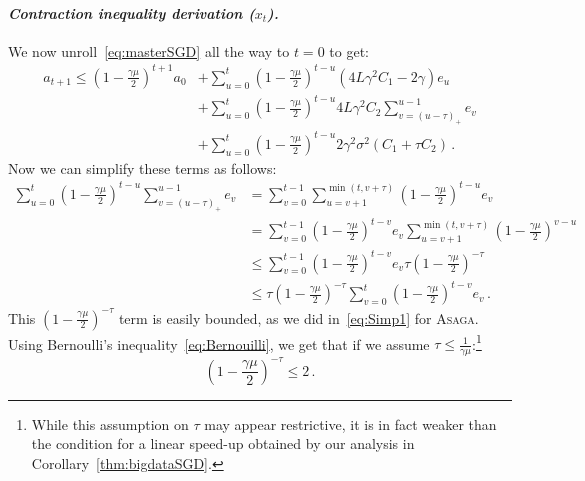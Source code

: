 \documentclass[twoside, 11pt]{article}
\newcommand{\stepsize}{\gamma}
\newcommand{\strongconvex}{\mu}
\newcommand{\overlap}{\tau}
\newcommand{\lipschitz}{L}
\newcommand{\ASAGA}{\textsc{Asaga}}
\begin{document}
\paragraph{\textit{Contraction inequality derivation ($x_t$).}}
We now unroll~\eqref{eq:masterSGD} all the way to $t=0$ to get:
\begin{equation}\label{eq:sgdcontr}
\begin{aligned}
a_{t+1}
\leq (1 - \frac{\stepsize\strongconvex}{2})^{t+1} a_0
&+ \sum_{u = 0}^{t} (1 - \frac{\stepsize\strongconvex}{2})^{t-u} (4\lipschitz \stepsize^2 C_1 - 2 \stepsize) e_u
\\
&+ \sum_{u = 0}^{t} (1 - \frac{\stepsize\strongconvex}{2})^{t-u} 4\lipschitz \stepsize^2 C_2 \sum_{v = (u - \overlap)_+}^{u-1} e_v
\\
&+ \sum_{u = 0}^{t} (1 - \frac{\stepsize\strongconvex}{2})^{t-u} 2 \stepsize^2 \sigma^2 (C_1 +  \overlap C_2) \,.
\end{aligned}
\end{equation}
Now we can simplify these terms as follows:
\begin{align}
\sum_{u = 0}^{t} (1 - \frac{\stepsize\strongconvex}{2})^{t-u}  \sum_{v = (u - \overlap)_+}^{u-1} e_v
&=
\sum_{v = 0}^{t-1} \sum_{u = v +1}^{\min(t, v + \overlap)} (1 - \frac{\stepsize\strongconvex}{2})^{t-u} e_v
\nonumber \\
&=
\sum_{v = 0}^{t-1} (1 - \frac{\stepsize\strongconvex}{2})^{t-v} e_v \sum_{u = v +1}^{\min(t, v + \overlap)} (1 - \frac{\stepsize\strongconvex}{2})^{v-u}
\nonumber \\
&\leq \sum_{v = 0}^{t-1} (1 - \frac{\stepsize\strongconvex}{2})^{t-v} e_v \overlap (1 - \frac{\stepsize\strongconvex}{2})^{-\overlap}
\nonumber \\
&\leq \overlap (1 - \frac{\stepsize\strongconvex}{2})^{-\overlap} \sum_{v = 0}^{t} (1 - \frac{\stepsize\strongconvex}{2})^{t-v} e_v\, . \label{eq:sgdsimp1}
\end{align}
This $(1 - \frac{\stepsize\strongconvex}{2})^{-\overlap}$ term is easily bounded, as we did in~\eqref{eq:Simp1} for \ASAGA.
Using Bernoulli's inequality~\eqref{eq:Bernouilli}, we get that if we assume $\overlap \leq \frac{1}{\stepsize \strongconvex}$:\footnote{While this assumption on $\overlap$ may appear restrictive, it is in fact weaker than the condition for a linear speed-up obtained by our analysis in Corollary~\ref{thm:bigdataSGD}.}
\begin{equation}\label{eq:sgdsimp2}
(1 - \frac{\stepsize\strongconvex}{2})^{-\overlap} \leq 2 \,.
\end{equation}
\end{document}
